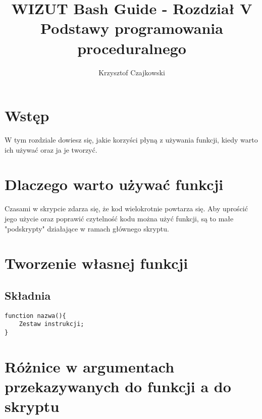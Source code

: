 \documentclass[10 pt, a4paper]{article}
\author{Krzysztof Czajkowski}
\title{WIZUT Bash Guide - Rozdział V\\
Podstawy programowania proceduralnego}
\begin{document}
\maketitle
\tableofcontents
\newpage
\section{Wstęp}
W tym rozdziale dowiesz się, jakie korzyści płyną z używania funkcji, kiedy warto ich używać oraz ja je tworzyć.
\section{Dlaczego warto używać funkcji}
Czasami w skrypcie zdarza się, że kod wielokrotnie powtarza się. Aby uprościć jego użycie
oraz poprawić czytelność kodu można użyć funkcji, są to małe "podskrypty" działające w
ramach głównego skryptu.
\section{Tworzenie własnej funkcji}
\subsection{Składnia}
\begin{lstlisting}
function nazwa(){
	Zestaw instrukcji;
}
\end{lstlisting}
\section{Różnice w argumentach przekazywanych do funkcji a do skryptu}
\end{document}

